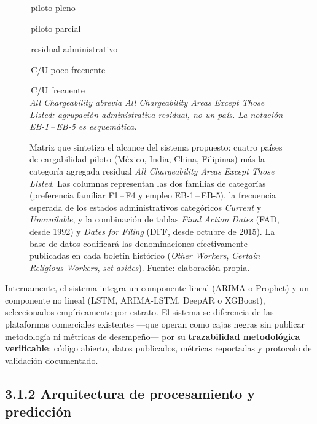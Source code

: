 \documentclass[12pt,letterpaper]{report}
\begin{document}
\begin{figure}[H]
    \vspace{6pt}
    \begin{minipage}{0.95\textwidth}
        \centering
        {\scriptsize
        \colorbox{uacjyellow!35}{\strut\hspace{0.45cm}}\,piloto pleno~~%
        \colorbox{uacjyellow!18}{\strut\hspace{0.45cm}}\,piloto parcial~~%
        \colorbox{uacjgray!10}{\strut\hspace{0.45cm}}\,residual administrativo~~%
        \colorbox{uacjblue!4}{\strut\hspace{0.45cm}}\,C/U poco frecuente~~%
        \colorbox{uacjgray!18}{\strut\hspace{0.45cm}}\,C/U frecuente\\[3pt]
        \textit{\textcolor{uacjgray}{\textit{All Chargeability} abrevia \textit{All Chargeability Areas Except Those Listed}: agrupación administrativa residual, no un país. La notación EB-1\,--\,EB-5 es esquemática.}}
        }
    \end{minipage}
    \caption[Matriz analítica del alcance del sistema.]{Matriz que sintetiza el alcance del sistema propuesto: cuatro países de cargabilidad piloto (México, India, China, Filipinas) más la categoría agregada residual \textit{All Chargeability Areas Except Those Listed}. Las columnas representan las dos familias de categorías (preferencia familiar F1\,--\,F4 y empleo EB-1\,--\,EB-5), la frecuencia esperada de los estados administrativos categóricos \textit{Current} y \textit{Unavailable}, y la combinación de tablas \textit{Final Action Dates} (FAD, desde 1992) y \textit{Dates for Filing} (DFF, desde octubre de 2015). La base de datos codificará las denominaciones efectivamente publicadas en cada boletín histórico (\textit{Other Workers}, \textit{Certain Religious Workers}, \textit{set-asides}). Fuente: elaboración propia.}
    \label{fig:matriz_visapredict}
\end{figure}

Internamente, el sistema integra un componente lineal (ARIMA o Prophet) y un componente no lineal (LSTM, ARIMA-LSTM, DeepAR o XGBoost), seleccionados empíricamente por estrato. El sistema se diferencia de las plataformas comerciales existentes ---que operan como cajas negras sin publicar metodología ni métricas de desempeño--- por su \textbf{trazabilidad metodológica verificable}: código abierto, datos publicados, métricas reportadas y protocolo de validación documentado.

\subsection*{3.1.2 Arquitectura de procesamiento y predicción}
\end{document}
